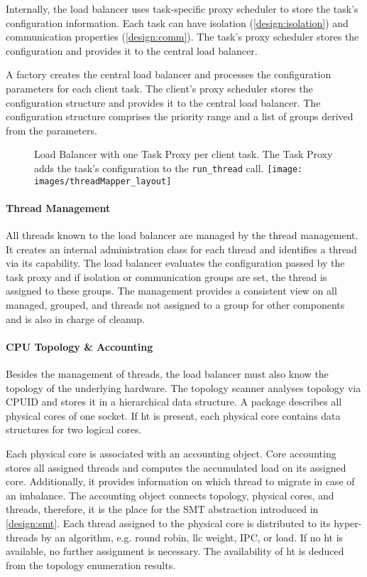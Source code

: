 Internally, the load balancer uses task-specific proxy scheduler to store the
task's configuration information.
Each task can have isolation (\ref{design:isolation}) and communication
properties (\ref{design:comm}).
The task's proxy scheduler stores the configuration and provides it to the
central load balancer.

A factory creates the central load balancer and processes the configuration
parameters for each client task.
The client's proxy scheduler stores the configuration structure and provides it
to the central load balancer.
The configuration structure comprises the priority range and a list of
groups derived from the parameters.

\begin{figure}[h!]
  \setcapindent*{1em}
  \begin{captionbeside}[]{Load Balancer with one Task Proxy per client task.
      The Task Proxy adds the task's configuration to the \texttt{run\_thread}
    call.}
  \texttt{[image: images/threadMapper\_layout]}
\end{captionbeside}
  \label{state:figbalancer_proxy}
\end{figure}


\paragraph{Thread Management}
All threads known to the load balancer are managed by the thread management.
It creates an internal administration class for each thread and identifies a
thread via its capability.
The load balancer evaluates the configuration passed by the task proxy and
if isolation or communication groups are set, the thread is assigned to these
groups.
The management provides a consistent view on all managed, grouped, and threads
not assigned to a group for other components and is also in charge of cleanup.


\paragraph{CPU Topology \& Accounting}
Besides the management of threads, the load balancer must also know the
topology of the underlying hardware.
The topology scanner analyses topology via CPUID and stores it in a
hierarchical data structure.
A package describes all physical cores of one socket.
If \gls{ht} is present, each physical core contains data structures for
two logical cores.

Each physical core is associated with an accounting object.
Core accounting stores all assigned threads and computes the accumulated
load on its assigned core.
Additionally, it provides information on which thread to migrate in case of an
imbalance.
The accounting object connects topology, physical cores, and threads, therefore,
it is the place for the SMT abstraction introduced in \ref{design:smt}.
Each thread assigned to the physical core is distributed to its hyper-threads
by an algorithm, e.g. round robin, \gls{llc} weight, IPC, or load.
If no \gls{ht} is available, no further assignment is necessary.
The availability of \gls{ht} is deduced from the topology enumeration results.


